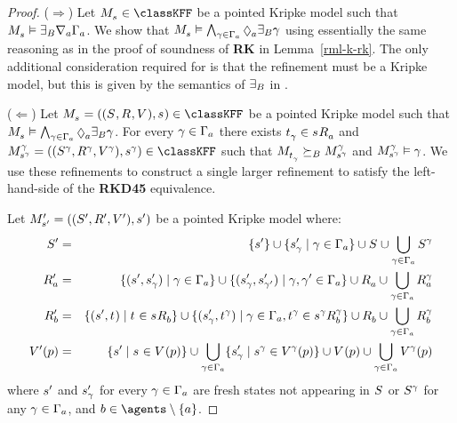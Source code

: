 \begin{proof}
($\Rightarrow$) Let $\kPModel{\kStateS} \in \classKFF$ be a pointed Kripke model such that $\kPModel{\kStateS} \entails \somerefsBs \coversA \Gamma_\agentA$.
We show that $\kPModel{\kStateS} \entails \bigwedge_{\gamma \in \Gamma_\agentA} \possibleA \somerefsBs \gamma$ using essentially the same reasoning as in the proof of soundness of {\bf RK} in Lemma~\ref{rml-k-rk}.
The only additional consideration required for \logicRmlKFF{} is that the refinement must be a \classKFF{} Kripke model, but this is given by the semantics of $\somerefsBs$ in \logicRmlKFF{}.

($\Leftarrow$) Let $\kPModelAndTuple{\kStateS} \in \classKFF$ be a pointed Kripke model such that $\kPModel{\kStateS} \entails \bigwedge_{\gamma \in \Gamma_\agentA} \possibleA \somerefsBs \gamma$.
For every $\gamma \in \Gamma_\agentA$ there exists $\kStateT_\gamma \in \kSuccessorsA{\kStateS}$ and $\kPModelAndTuple[\gamma]{\kStateS[\gamma]} \in \classKFF$ such that $\kPModel{\kStateT_\gamma} \simulatesBs \kPModel[\gamma]{\kStateS[\gamma]}$ and $\kPModel[\gamma]{\kStateS[\gamma]} \entails \gamma$.
We use these refinements to construct a single larger refinement to satisfy the left-hand-side of the {\bf RKD45} equivalence.

Let $\kPModelAndTupleP{\kStateSP}$ be a pointed Kripke model where:
\begin{eqnarray*}
    \kStatesP &=& \{\kStateSP\} \cup \{\kStateSP_\gamma \mid \gamma \in \Gamma_\agentA\} \cup \kStates \cup \bigcup_{\gamma \in \Gamma_\agentA} \kStates[\gamma]\\
    \kAccessibilityPA &=& \{(\kStateSP, \kStateSP_\gamma) \mid \gamma \in \Gamma_\agentA\} \cup \{(\kStateSP_\gamma, \kStateSP_{\gamma'}) \mid \gamma, \gamma' \in \Gamma_\agentA\} \cup \kAccessibilityA \cup \bigcup_{\gamma \in \Gamma_\agentA} \kAccessibilityA[\gamma]\\
    \kAccessibilityPB &=& \{(\kStateSP, \kStateT) \mid \kStateT \in \kSuccessorsB{\kStateS}\} \cup \{(\kStateSP_\gamma, \kStateT[\gamma]) \mid \gamma \in \Gamma_\agentA, \kStateT[\gamma] \in \kSuccessorsB[\gamma]{\kStateS[\gamma]}\} \cup \kAccessibilityB \cup \bigcup_{\gamma \in \Gamma_\agentA} \kAccessibilityB[\gamma]\\
    \kValuationP(\atomP) &=& \{\kStateSP \mid \kStateS \in \kValuation(\atomP)\} \cup \bigcup_{\gamma \in \Gamma_\agentA} \{\kStateSP_\gamma \mid \kStateS[\gamma] \in \kValuation[\gamma](\atomP)\} \cup \kValuation(\atomP) \cup \bigcup_{\gamma \in \Gamma_\agentA} \kValuation[\gamma](\atomP)
\end{eqnarray*}
where $\kStateSP$ and $\kStateSP_\gamma$ for every $\gamma \in \Gamma_\agentA$ are fresh states not appearing in $\kStates$ or $\kStates[\gamma]$ for any $\gamma \in \Gamma_\agentA$, and $\agentB \in \agents \setminus \{\agentA\}$.


\end{proof}
